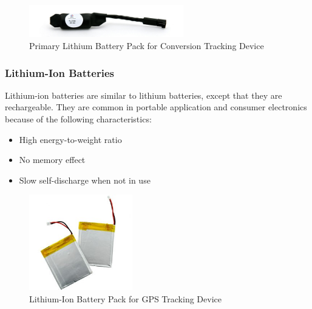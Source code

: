 \documentclass[report.tex]{subfiles}
\begin{document}
\begin{figure}[H]
	\centering
	\includegraphics[width=0.6\textwidth]{Include/Figure/Hardware/primary-lithium-battery-pack.jpg}
	\caption{Primary Lithium Battery Pack for Conversion Tracking Device\cite{litBatTech}}
	\label{fig:lithbatpack}
\end{figure}

\subsubsection{Lithium-Ion Batteries\cite{litBatTech}}
Lithium-ion batteries are similar to lithium batteries, except that they are rechargeable. They are common in portable application and consumer electronics because of the following characteristics: 
\begin{itemize}
\item High energy-to-weight ratio
\item No memory effect
\item Slow self-discharge when not in use
\end{itemize}

\begin{figure}[H]
	\centering
	\includegraphics[width=0.4\textwidth]{Include/Figure/Hardware/lithium-ion-battery-pack.jpg}
	\caption{Lithium-Ion Battery Pack for GPS Tracking Device\cite{litBatTech}}
	\label{fig:lithionpack}
\end{figure}
\end{document}
